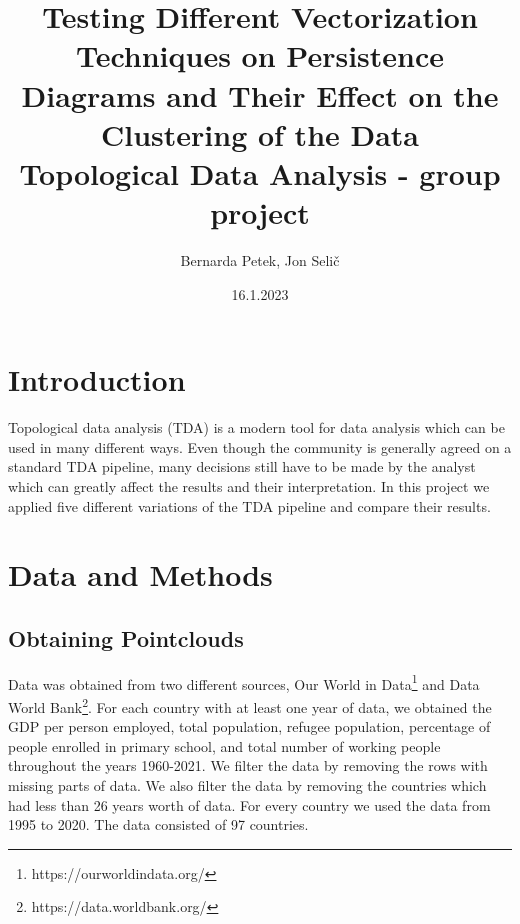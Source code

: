 \documentclass[12pt]{article}
\begin{document}
	
	
	
	
	\title{Testing Different Vectorization Techniques on Persistence Diagrams and Their Effect on the Clustering of the Data \\   \large  Topological Data Analysis - group project}
	\author{%
		Bernarda Petek, Jon Selič} %
	
	\date{16.1.2023}
	\maketitle
	
	
	
\section{Introduction}
Topological data analysis (TDA) is a modern tool for data analysis which can be used in many different ways. Even though the community is generally agreed on a standard TDA pipeline, many decisions still have to be made by the analyst which can greatly affect the results and their interpretation. In this project we applied five different variations of the TDA pipeline and compare their results.

\section{Data and Methods}
\subsection{Obtaining Pointclouds}
Data was obtained from two different sources, Our World in Data\footnote{https://ourworldindata.org/} and Data World Bank\footnote{https://data.worldbank.org/}. For each country with at least one year of data, we obtained the GDP per person employed, total population, refugee population, percentage of people enrolled in primary school, and total number of working people throughout the years 1960-2021. We filter the data by removing the rows with missing parts of data. We also filter the data by removing the countries which had less than 26 years worth of data. For every country we used the data from 1995 to 2020. The data consisted of 97 countries.
\end{document}

